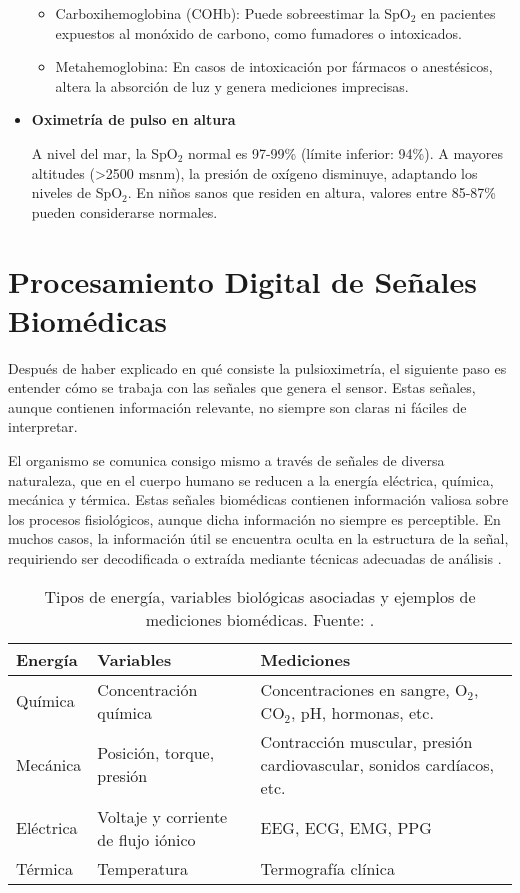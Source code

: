 \begin{itemize}
\begin{itemize}
    \item Carboxihemoglobina (COHb): Puede sobreestimar la SpO$_2$ en pacientes expuestos al monóxido de carbono, como fumadores o intoxicados. 
    \item Metahemoglobina: En casos de intoxicación por fármacos o anestésicos, altera la absorción de luz y genera mediciones imprecisas. 
\end{itemize}

\item \textbf{Oximetría de pulso en altura}

A nivel del mar, la SpO$_2$ normal es 97-99\% (límite inferior: 94\%). A mayores altitudes (>2500 msnm), la presión de oxígeno disminuye, adaptando los niveles de SpO$_2$. En niños sanos que residen en altura, valores entre 85-87\% pueden considerarse normales. \cite{oximetria_pulso2012}

\end{itemize}

\section{Procesamiento Digital de Señales Biomédicas}

Después de haber explicado en qué consiste la pulsioximetría, el siguiente paso es entender cómo se trabaja con las señales que genera el sensor. Estas señales, aunque contienen información relevante, no siempre son claras ni fáciles de interpretar.

El organismo se comunica consigo mismo a través de señales de diversa naturaleza, que en el cuerpo humano se reducen a la energía eléctrica, química, mecánica y térmica. Estas señales biomédicas contienen información valiosa sobre los procesos fisiológicos, aunque dicha información no siempre es perceptible. En muchos casos, la información útil se encuentra oculta en la estructura de la señal, requiriendo ser decodificada o extraída mediante técnicas adecuadas de análisis \cite{carrion2011procesado}.


\begin{table}[H]
\centering
\begin{tabular}{|l|p{5cm}|p{6cm}|}
\hline
\textbf{Energía} & \textbf{Variables} & \textbf{Mediciones} \\
\hline
Química   & Concentración química & Concentraciones en sangre, O$_2$, CO$_2$, pH, hormonas, etc. \\ \hline
Mecánica  & Posición, torque, presión & Contracción muscular, presión cardiovascular, sonidos cardíacos, etc. \\\hline
Eléctrica & Voltaje y corriente de flujo iónico & EEG, ECG, EMG, PPG \\\hline
Térmica   & Temperatura & Termografía clínica \\
\hline
\end{tabular}
\caption{Tipos de energía, variables biológicas asociadas y ejemplos de mediciones biomédicas. Fuente: \cite{dePedroCarracedo2020}.}
\label{tabla:energia}
\end{table}


